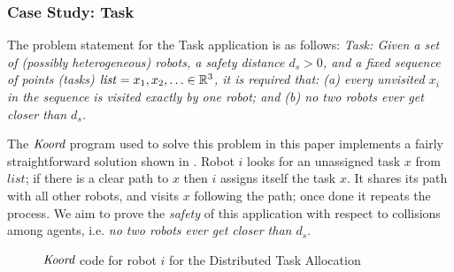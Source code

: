 
\newcommand{\Task}{\textsf{Task}\xspace}

\subsubsection{Case Study: \Task}
The problem statement for the \Task application is as follows: {\small \em \Task: Given a set of (possibly heterogeneous) robots, a safety distance $d_s>0$, and a fixed sequence of points (tasks) $\mathit{list} = x_1, x_2, \ldots \in \reals^3$, it is required that: (a) every unvisited $x_i$ in the sequence is {\em visited\/} exactly by one robot; and (b) no two robots ever get closer than $d_s$.\/}

The $\emph{Koord}$ program used to solve this problem in this paper implements a fairly straightforward solution shown in . Robot $i$ looks for an unassigned task $x$ from $\mathit{list}$; if there is a clear path to $x$ then $i$ assigns itself the task $x$. It shares its path with all other robots, and  visits $x$ following the path; once done it repeats the process.  We aim to prove the \emph{safety} of this application with respect to collisions among agents, i.e. \emph{no two robots ever get closer than $d_s$}.

\begin{figure}[t]
    {
    
    }
    {
    
    }
    \caption{ $\emph{Koord}$ code for robot $i$ for the Distributed Task Allocation}
    \label{fig:taskapp }
\end{figure}


